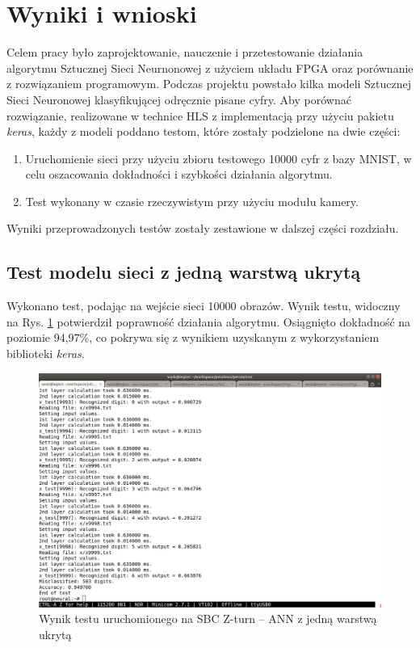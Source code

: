 \newpage %
\cleardoublepage %
\pagestyle{headings}

\section{Wyniki i wnioski}

Celem pracy było zaprojektowanie, nauczenie i przetestowanie działania algorytmu Sztucznej Sieci Neurnonowej z użyciem 
układu FPGA oraz porównanie z rozwiązaniem programowym. Podczas projektu powstało kilka modeli Sztucznej Sieci 
Neuronowej klasyfikującej odręcznie pisane cyfry. Aby porównać rozwiązanie, realizowane w technice HLS z implementacją 
przy użyciu pakietu \emph{keras}, każdy z modeli poddano testom, które zostały podzielone na dwie części:
\bigskip
\begin{enumerate}
  \item Uruchomienie sieci przy użyciu zbioru testowego 10000 cyfr z bazy MNIST, w celu oszacowania dokładności i 
  szybkości działania algorytmu.
  \item Test wykonany w czasie rzeczywistym przy użyciu modułu kamery.
\end{enumerate}

Wyniki przeprowadzonych testów zostały zestawione w dalszej części rozdziału.

\subsection{Test modelu sieci z jedną warstwą ukrytą}

Wykonano test, podając na wejście sieci 10000 obrazów. Wynik testu, widoczny na Rys. \ref{wynik1} potwierdził poprawność działania algorytmu. Osiągnięto dokładność na poziomie 94,97\%, co pokrywa się z wynikiem uzyskanym z wykorzystaniem biblioteki \emph{keras}.

\begin{figure}[!h]
    \centering
    \includegraphics[width=\textwidth]{img/wynik1.png}
    \caption{Wynik testu uruchomionego na SBC Z-turn -- ANN z jedną warstwą ukrytą}
    \label{wynik1}
  \end{figure}


